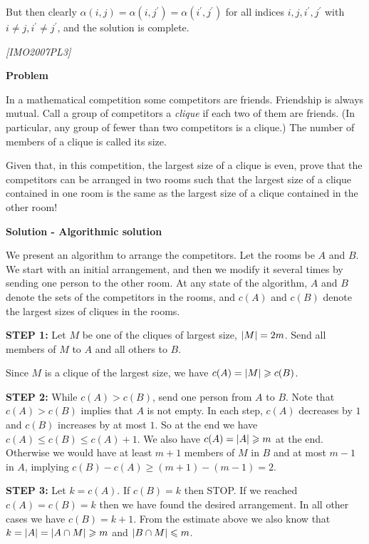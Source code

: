 \begin{problem}
But then clearly $\alpha(i, j) = \alpha(i, j^\prime)= \alpha(i^\prime, j^\prime)$ for all indices $i, j, i^\prime, j^\prime$ with $i\ne j, i^\prime \ne j^\prime $, and the solution is complete.

\end{problem}
%
\filbreak
\begin{problem}
\textit{[IMO2007PL3]}

\textbf{Problem}

In a mathematical competition some competitors are friends. Friendship is always mutual. Call a group of competitors a \textit{clique} if each two of them are friends. (In particular, any group of fewer than two competitors is a clique.) The number of members of a clique is called its size. 

Given that, in this competition, the largest size of a clique is even, prove that the competitors can be arranged in two rooms such that the largest size of a clique contained in one room is the same as the largest size of a clique contained in the other room!

\textbf{Solution - Algorithmic solution}

We present an algorithm to arrange the competitors. Let the rooms be $A$ and $B$. We start with an
initial arrangement, and then we modify it several times by sending one person to the other room. At
any state of the algorithm, $A$ and $B$ denote the sets of the competitors in the rooms, and $c(A)$ and
$c(B)$ denote the largest sizes of cliques in the rooms.

\textbf{STEP 1:} Let $M$ be one of the cliques of largest size, $\lvert M\rvert = 2m$. Send all members of $M$ to $A$ and all
others to $B$.  

Since $M$ is a clique of the largest size, we have $c(A) = \lvert M\rvert \geqslant  c(B)$.

\textbf{STEP 2:} While $c(A) > c(B)$, send one person from $A$ to $B$.
Note that $c(A) > c(B)$ implies that $A$ is not empty. In each step, $c(A)$ decreases by $1$ and $c(B)$
increases by at most $1$. So at the end we have $c(A) \leq c(B) \leq c(A) + 1$.
We also have $c(A) = \lvert A\rvert\geqslant m$ at the end. Otherwise we would have at least $m + 1$ members of $M$ in
$B$ and at most $m − 1$ in $A$, implying $c(B) − c(A) \geq (m + 1) − (m − 1) = 2$.


\textbf{STEP 3:}  Let $k = c(A)$. If $c(B) = k$ then STOP.
If we reached $c(A) = c(B) = k$ then we have found the desired arrangement. In all other cases we have
$c(B) = k + 1$. From the estimate above we also know that $k = \lvert A\rvert = \lvert A \cap  M\rvert \geqslant m$ and $\lvert B \cap M\rvert \leqslant m$.



\end{problem}

